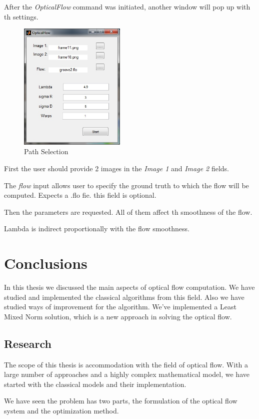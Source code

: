 \documentclass[12pt,a4paper,twoside]{report}
\begin{document}
{After the \textit{OpticalFlow} command was initiated, another window will pop up with th settings.

		\begin{figure}
			\centering
			\includegraphics[width = 2in]{img/inputwindow}
			\caption{Path Selection}
		\end{figure}
		
First the user should provide 2 images in the \textit{Image 1} and \textit{Image 2} fields. 

The \textit{flow} input allows user to specify the ground truth to which the flow will be computed. Expects a .flo fie. this field is optional.

Then the parameters are requested. All of them affect th smoothness of the flow.

Lambda is indirect proportionally with the flow smoothness.

\chapter{Conclusions}

In this thesis we discussed the main aspects of optical flow computation. We have studied and implemented the classical algorithms from this field. Also we have studied ways of improvement for the algorithm. We've implemented a Least Mixed Norm solution, which is a new approach in solving the optical flow.


\section{Research}
The scope of this thesis is accommodation with the field of optical flow. With a large number of approaches and a highly complex mathematical model, we have started with the classical models and their implementation. 

We have seen the problem has two parts, the formulation of the optical flow system and the optimization method.

}
\end{document}
